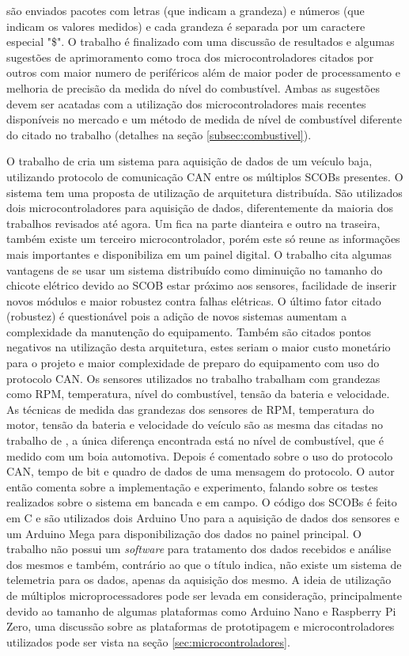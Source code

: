 são enviados pacotes com letras (que indicam a grandeza) e números (que indicam os valores medidos) e cada grandeza é separada por um caractere especial "\$". O trabalho é finalizado com uma discussão de resultados e algumas sugestões de aprimoramento como troca dos microcontroladores citados por outros com maior numero de periféricos além de maior poder de processamento e melhoria de precisão da medida do nível do combustível. Ambas as sugestões devem ser acatadas com a utilização dos microcontroladores mais recentes disponíveis no mercado e um método de medida de nível de combustível diferente do citado no trabalho (detalhes na seção \ref{subsec:combustivel}).

O trabalho de  cria um sistema para aquisição de dados de um veículo baja, utilizando protocolo de comunicação CAN entre os múltiplos SCOBs presentes. O sistema tem uma proposta de utilização de arquitetura distribuída. São utilizados dois microcontroladores para aquisição de dados, diferentemente da maioria dos trabalhos revisados até agora. Um fica na parte dianteira e outro na traseira, também existe um terceiro microcontrolador, porém este só reune as informações mais importantes e disponibiliza em um painel digital. O trabalho cita algumas vantagens de se usar um sistema distribuído como diminuição no tamanho do chicote elétrico devido ao SCOB estar próximo aos sensores, facilidade de inserir novos módulos e maior robustez contra falhas elétricas. O último fator citado (robustez) é questionável pois a adição de novos sistemas aumentam a complexidade da manutenção do equipamento. Também são citados pontos negativos na utilização desta arquitetura, estes seriam o maior custo monetário para o projeto e maior complexidade de preparo do equipamento com uso do protocolo CAN. Os sensores utilizados no trabalho trabalham com grandezas como RPM, temperatura, nível do combustível, tensão da bateria e velocidade. As técnicas de medida das grandezas dos sensores de RPM, temperatura do motor, tensão da bateria e velocidade do veículo são as mesma das citadas no trabalho de , a única diferença encontrada está no nível de combustível, que é medido com um boia automotiva. Depois é comentado sobre o uso do protocolo CAN, tempo de bit e quadro de dados de uma mensagem do protocolo. O autor então comenta sobre a implementação e experimento, falando sobre os testes realizados sobre o sistema em bancada e em campo. O código dos SCOBs é feito em C e são utilizados dois Arduino Uno para a aquisição de dados dos sensores e um Arduino Mega para disponibilização dos dados no painel principal. O trabalho não possui um \textit{software} para tratamento dos dados recebidos e análise dos mesmos e também, contrário ao que o título indica, não existe um sistema de telemetria para os dados, apenas da aquisição dos mesmo. A ideia de utilização de múltiplos microprocessadores pode ser levada em consideração, principalmente devido ao tamanho de algumas plataformas como Arduino Nano e Raspberry Pi Zero, uma discussão sobre as plataformas de prototipagem e microcontroladores utilizados pode ser vista na seção \ref{sec:microcontroladores}.

